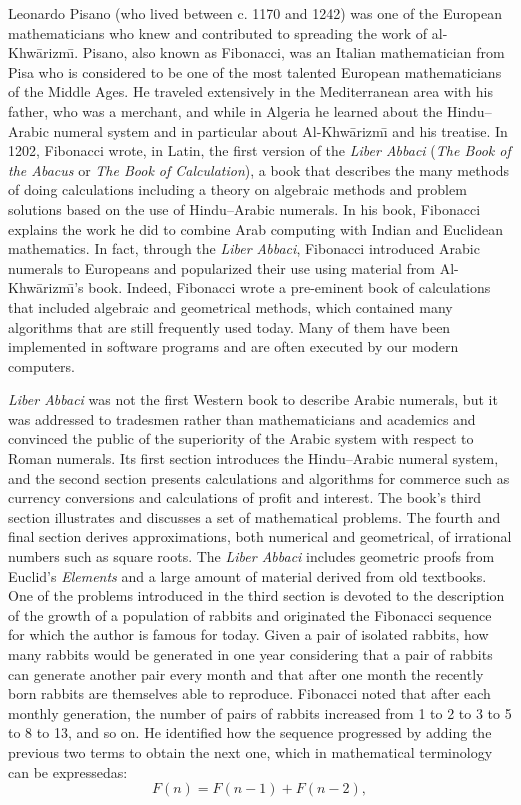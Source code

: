 {{Leonardo Pisano (who lived between c. 1170 and 1242) was one of the European mathematicians who knew and contributed\vadjust{\pagebreak} to spreading the work of al-Khw\={a}rizm\={\i}. Pisano, also known as Fibonacci, was an Italian mathematician from Pisa who is considered to be one of the most talented European mathematicians of the Middle Ages. He traveled extensively in the Mediterranean area with his father, who was a merchant, and while in Algeria he learned about the Hindu--Arabic numeral system and in particular about Al-Khw\={a}rizm\={\i} and his treatise. In 1202, Fibonacci wrote, in Latin, the first version of the \textit{Liber Abbaci} (\textit{The Book of the Abacus} or \textit{The Book of Calculation}), a book that describes the many methods of doing calculations including a theory on algebraic methods and problem solutions based on the use of Hindu--Arabic numerals. In his book, Fibonacci explains the work he did to combine Arab computing with Indian and Euclidean mathematics. In fact, through the \textit{Liber Abbaci}, Fibonacci introduced Arabic numerals to Europeans and popularized their use using material from Al-Khw\={a}rizm\={\i}'s book. Indeed, Fibonacci wrote a pre-eminent book of calculations that included algebraic and geometrical methods, which contained many algorithms that are still frequently used today. Many of them have been implemented in software programs and are often executed by our modern computers.


\textit{Liber Abbaci} was not the first Western book to describe Arabic numerals, but it was addressed to tradesmen rather than mathematicians and academics and convinced the public of the superiority of the Arabic system with respect to Roman numerals. Its first section introduces the Hindu--Arabic numeral system, and the second section presents calculations and algorithms for commerce such as currency conversions and calculations of profit and interest. The book's third section illustrates and discusses a set of mathematical problems. The fourth and final section derives approximations, both numerical and geometrical, of irrational numbers such as square roots. The \textit{Liber Abbaci} includes geometric proofs from Euclid's \textit{Elements} and a large amount of  material derived from old textbooks. One of the problems introduced in the third section is devoted to the description of the growth of a population of rabbits and originated the Fibonacci sequence for which the author is famous for today. Given a pair of isolated rabbits, how many rabbits would be generated in one year considering that a pair of rabbits can generate another pair every month and that after one month the recently born rabbits are themselves able to reproduce. Fibonacci noted that after each monthly generation, the number of pairs of rabbits increased from 1 to 2 to 3 to 5 to 8 to 13, and so on. He identified how the sequence progressed by adding the previous two terms to obtain the next one, which in mathematical terminology can be expressed\break as:
\begin{equation*}
F(n)=F(n-1)+F(n-2),
\end{equation*}
\removelastskip{\vfill\pagebreak}

}}
